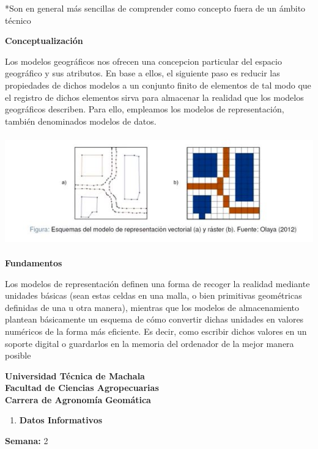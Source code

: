 \documentclass[
]{article}
\providecommand{\tightlist}{%
  \setlength{\itemsep}{0pt}\setlength{\parskip}{0pt}}
\begin{document}
*Son en general más sencillas de comprender como concepto fuera de un
ámbito técnico

\textbf{Conceptualización}

Los modelos geográficos nos ofrecen una concepcion particular del
espacio geográfico y sus atributos. En base a ellos, el siguiente paso
es reducir las propiedades de dichos modelos a un conjunto finito de
elementos de tal modo que el registro de dichos elementos sirva para
almacenar la realidad que los modelos geográficos describen. Para ello,
empleamos los modelos de representación, también denominados modelos de
datos.

\includegraphics[width=\textwidth,height=1.875in]{3.jpg}

\textbf{Fundamentos}

Los modelos de representación definen una forma de recoger la realidad
mediante unidades básicas (sean estas celdas en una malla, o bien
primitivas geométricas definidas de una u otra manera), mientras que los
modelos de almacenamiento plantean básicamente un esquema de cómo
convertir dichas unidades en valores numéricos de la forma más
eficiente. Es decir, como escribir dichos valores en un soporte digital
o guardarlos en la memoria del ordenador de la mejor manera posible

\newpage
\begin{center}
{\large \textbf{Universidad Técnica de Machala}}\\
\textbf{Facultad de Ciencias Agropecuarias}\\
\textbf{Carrera de Agronomía}
\vspace{2mm}
\textbf{Geomática}
\end{center}

\begin{enumerate}
\def\labelenumi{\arabic{enumi}.}
\tightlist
\item
  \textbf{Datos Informativos}
\end{enumerate}

\textbf{Semana:} 2
\end{document}
